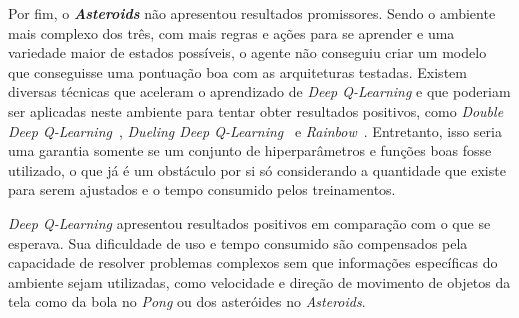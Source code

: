 Por fim, o \textbf{\textit{Asteroids}} não apresentou resultados promissores.
Sendo o ambiente mais complexo dos três, com mais regras e ações para se aprender e uma variedade maior de estados possíveis, o agente não conseguiu criar um modelo que conseguisse uma pontuação boa com as arquiteturas testadas.
Existem diversas técnicas que aceleram o aprendizado de \textit{Deep Q-Learning} e que poderiam ser aplicadas neste ambiente para tentar obter resultados positivos, como \textit{Double Deep Q-Learning}~\cite{DBLP:journals/corr/HasseltGS15}, \textit{Dueling Deep Q-Learning}~\cite{DBLP:journals/corr/WangFL15} e \textit{Rainbow}~\cite{DBLP:journals/corr/abs-1710-02298}.
Entretanto, isso seria uma garantia somente se um conjunto de hiperparâmetros e funções boas fosse utilizado, o que já é um obstáculo por si só considerando a quantidade que existe para serem ajustados e o tempo consumido pelos treinamentos.

\textit{Deep Q-Learning} apresentou resultados positivos em comparação com o que se esperava.
Sua dificuldade de uso e tempo consumido são compensados pela capacidade de resolver problemas complexos sem que informações específicas do ambiente sejam utilizadas, como velocidade e direção de movimento de objetos da tela como da bola no \textit{Pong} ou dos asteróides no \textit{Asteroids}.
